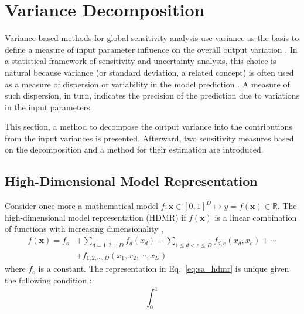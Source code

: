 \section{Variance Decomposition}\label{sec:sa_variance_decomposition}

Variance-based methods for global sensitivity analysis use variance as the basis to define a measure of input parameter influence on the overall output variation \cite{Cacuci2004}.
In a statistical framework of sensitivity and uncertainty analysis, 
this choice is natural because variance (or standard deviation, a related concept) is often used as a measure of dispersion or variability in the model prediction \cite{Saltelli2008}.
A measure of such dispersion, in turn, indicates the precision of the prediction due to variations in the input parameters.

This section, a method to decompose the output variance into the contributions from the input variances is presented.
Afterward, two sensitivity measures based on the decomposition and a method for their estimation are introduced.

\subsection{High-Dimensional Model Representation}\label{sec:sa_hdmr}

Consider once more a mathematical model $f: \mathbf{x} \in [0,1]^D \mapsto y = f(\mathbf{x}) \in \mathbb{R}$.
The high-dimensional model representation (HDMR) if $f(\mathbf{x})$ is a linear combination of functions with increasing dimensionality \cite{Li2001},
\begin{equation}
	\begin{split}
		f(\mathbf{x}) = f_o & + \sum_{d=1,2,...D} f_d(x_d) + \sum_{1\leq d < e \leq D} f_{d,e} (x_d, x_e) + \cdots  \\
	                      & + f_{1,2,\cdots,D} (x_1, x_2, \cdots, x_D)
	\end{split}
\label{eq:sa_hdmr}
\end{equation}
where $f_o$ is a constant. 
The representation in Eq.~\ref{eq:sa_hdmr} is unique given the following condition \cite{Sobol2001}:
\begin{equation}
	\int_{0}^{1} 
\label{eq:sa_unicity}
\end{equation}

